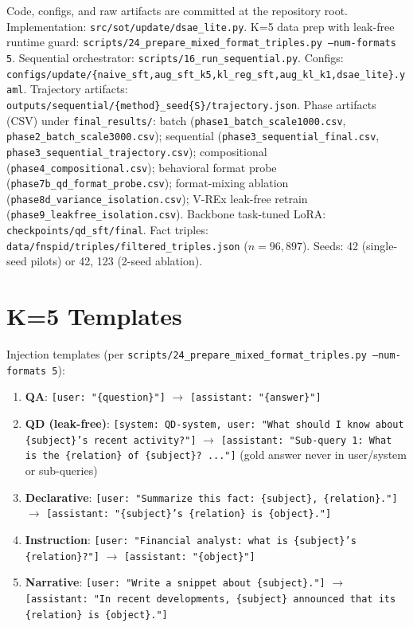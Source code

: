 \documentclass[11pt]{article}
\newcommand{\code}[1]{\texttt{\small #1}}
\begin{document}
Code, configs, and raw artifacts are committed at the repository root.
Implementation: \code{src/sot/update/dsae\_lite.py}. K=5 data prep with
leak-free runtime guard:
\code{scripts/24\_prepare\_mixed\_format\_triples.py --num-formats 5}.
Sequential orchestrator: \code{scripts/16\_run\_sequential.py}. Configs:
\code{configs/update/\{naive\_sft,aug\_sft\_k5,kl\_reg\_sft,aug\_kl\_k1,dsae\_lite\}.yaml}.
Trajectory artifacts:
\code{outputs/sequential/\{method\}\_seed\{S\}/trajectory.json}. Phase
artifacts (CSV) under \code{final\_results/}: batch
(\code{phase1\_batch\_scale1000.csv},
\code{phase2\_batch\_scale3000.csv}); sequential
(\code{phase3\_sequential\_final.csv},
\code{phase3\_sequential\_trajectory.csv}); compositional
(\code{phase4\_compositional.csv}); behavioral format probe
(\code{phase7b\_qd\_format\_probe.csv}); format-mixing ablation
(\code{phase8d\_variance\_isolation.csv}); V-REx leak-free retrain
(\code{phase9\_leakfree\_isolation.csv}). Backbone task-tuned LoRA:
\code{checkpoints/qd\_sft/final}. Fact triples:
\code{data/fnspid/triples/filtered\_triples.json} ($n=96{,}897$). Seeds:
42 (single-seed pilots) or 42, 123 (2-seed ablation).

\appendix
\section{K=5 Templates}

Injection templates (per
\code{scripts/24\_prepare\_mixed\_format\_triples.py --num-formats 5}):
\begin{enumerate}[leftmargin=*, itemsep=2pt]
  \item \textbf{QA}: \code{[user: "\{question\}"]} $\to$ \code{[assistant: "\{answer\}"]}
  \item \textbf{QD (leak-free)}: \code{[system: QD-system, user: "What should I know about \{subject\}'s recent activity?"]} $\to$ \code{[assistant: "Sub-query 1: What is the \{relation\} of \{subject\}? ..."]} (gold answer never in user/system or sub-queries)
  \item \textbf{Declarative}: \code{[user: "Summarize this fact: \{subject\}, \{relation\}."]} $\to$ \code{[assistant: "\{subject\}'s \{relation\} is \{object\}."]}
  \item \textbf{Instruction}: \code{[user: "Financial analyst: what is \{subject\}'s \{relation\}?"]} $\to$ \code{[assistant: "\{object\}"]}
  \item \textbf{Narrative}: \code{[user: "Write a snippet about \{subject\}."]} $\to$ \code{[assistant: "In recent developments, \{subject\} announced that its \{relation\} is \{object\}."]}
\end{enumerate}
\end{document}
